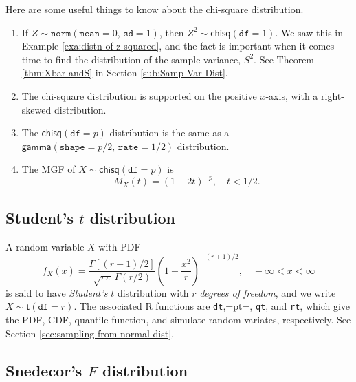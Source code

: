 \documentclass[captions=tableheading]{scrbook}
\begin{document}
\begin{rem}
Here are some useful things to know about the chi-square distribution.
\begin{enumerate}
\item If \(Z\sim\mathtt{norm}(\mathtt{mean}=0,\,\mathtt{sd}=1)\), then \(Z^{2}\sim\mathsf{chisq}(\mathtt{df}=1)\). We saw this in Example \ref{exa:distn-of-z-squared}, and the fact is important when it comes time to find the distribution of the sample variance, \(S^{2}\). See Theorem \ref{thm:Xbar-andS} in Section \ref{sub:Samp-Var-Dist}.
\item The chi-square distribution is supported on the positive \(x\)-axis, with a right-skewed distribution.
\item The \(\mathsf{chisq}(\mathtt{df}=p)\) distribution is the same as a \(\mathsf{gamma}(\mathtt{shape}=p/2,\,\mathtt{rate}=1/2)\) distribution.
\item The MGF of \(X\sim\mathsf{chisq}(\mathtt{df}=p)\) is
   \begin{equation}
   M_{X}(t)=\left(1-2t\right)^{-p},\quad t<1/2.\label{eq:mgf-chisq}
   \end{equation}
\end{enumerate}
\end{rem}
\subsection{Student's \(t\) distribution}
\label{sec-6-5-4}

\label{sub:Student's-t-distribution}

A random variable \(X\) with PDF
\begin{equation}
f_{X}(x)=\frac{\Gamma\left[(r+1)/2\right]}{\sqrt{r\pi}\,\Gamma(r/2)}\left(1+\frac{x^{2}}{r}\right)^{-(r+1)/2},\quad-\infty<x<\infty
\end{equation}
is said to have \emph{Student's} \(t\) distribution with \(r\) \emph{degrees of freedom}, and we write \(X\sim\mathsf{t}(\mathtt{df}=r)\). The associated \textsf{R} functions are \texttt{dt},=pt=, \texttt{qt}, and \texttt{rt}, which give the PDF, CDF, quantile function, and simulate random variates, respectively. See Section \ref{sec:sampling-from-normal-dist}.
\subsection{Snedecor's \(F\) distribution}
\label{sec-6-5-5}

\label{sub:snedecor-F-distribution}
\end{document}

